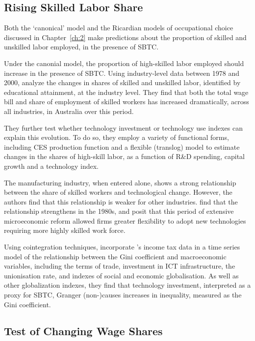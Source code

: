 \subsection{Rising Skilled Labor Share}

Both the `canonical' model and the Ricardian models of occupational choice discussed in Chapter~\ref{ch:2} make predictions about the proportion of skilled and unskilled labor employed, in the presence of SBTC. 

Under the canonial model, the proportion of high-skilled labor employed should increase in the presence of SBTC. Using industry-level data between 1978 and 2000, \citet{DeLaine2001} analyze the changes in shares of skilled and unskilled labor, identified by educational attainment, at the industry level. They find that both the total wage bill and share of employment of skilled workers has increased dramatically, across all industries, in Australia over this period.

They further test whether technology investment or technology use indexes can explain this evolution. To do so, they employ a variety of functional forms, including CES production function and a flexible (translog) model to estimate changes in the shares of high-skill labor, as a function of R\&D spending, capital growth and a technology index. 

The manufacturing industry, when entered alone, shows a strong relationship between the share of skilled workers and technological change. However, the authors find that this relationship is weaker for other industries. \citet{DeLaine2001} find that the relationship strengthens in the 1980s, and posit that this period of extensive microeconomic reform allowed firms greater flexibility to adopt new technologies requiring more highly skilled work force.


Using cointegration techniques, \citet{Gaston2009} incorporate \citet{Leigh2005}'s income tax data in a time series model of the relationship between the Gini coefficient and macroeconomic variables, including the terms of trade, investment in ICT infrastructure, the unionisation rate, and indexes of social and economic globalisation. As well as other globalization indexes, they find that technology investment, interpreted as a proxy for SBTC, Granger (non-)causes increases in inequality, measured as the Gini coefficient.


\subsection{Test of Changing Wage Shares}



